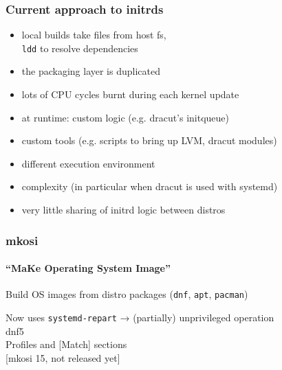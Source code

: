 \documentclass[]{beamer}
\newcommand\pp{}
\begin{document}
\begin{frame}
  \frametitle{Current approach to initrds}




  \pp

  \begin{itemize}
  \item local builds take files from host fs,\\
    \texttt{ldd} to resolve dependencies
  \pp

  \item the packaging layer is duplicated
  \pp

  \item lots of CPU cycles burnt during each kernel update
  \pp

  \quad

  \item at runtime: custom logic (e.g. dracut's initqueue)
  \pp

  \item custom tools (e.g. scripts to bring up LVM, dracut modules)
  \pp

  \item different execution environment
  \pp

  \item complexity (in particular when dracut is used with systemd)
  \pp

  \quad

  \item very little sharing of initrd logic between distros
  \end{itemize}
\end{frame}

\begin{frame}
  \frametitle{mkosi}
  \framesubtitle{``\textbf{M}a\textbf{K}e \textbf{O}perating \textbf{S}ystem \textbf{I}mage''}

  Build OS images from distro packages (\texttt{dnf}, \texttt{apt}, \texttt{pacman})
  \pp

  \vfill

  Now uses \texttt{systemd-repart} → (partially) unprivileged operation
  \\

  dnf5
  \\

  Profiles and [Match] sections
  \\

  [mkosi 15, not released yet]
\end{frame}
\end{document}
